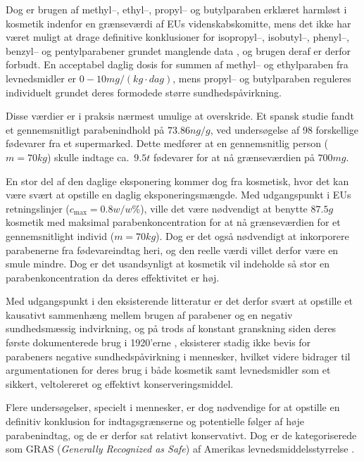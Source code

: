     Dog er brugen af methyl--, ethyl--, propyl-- og butylparaben erklæret harmløst i kosmetik indenfor en grænseværdi af EUs videnskabskomitte, mens det ikke har været muligt at drage definitive konklusioner for isopropyl--, isobutyl--, phenyl--, benzyl-- og pentylparabener grundet manglende data \parencite{Henr2013}, og brugen deraf er derfor forbudt. En acceptabel daglig dosis for summen af methyl-- og ethylparaben fra levnedsmidler er $0-10\si{mg\per (kg\cdot dag)}$,  mens propyl-- og butylparaben reguleres individuelt grundet deres formodede større sundhedspåvirkning.

    Disse værdier er i praksis nærmest umulige at overskride. Et spansk studie \parencite{Yola2020} fandt et gennemsnitligt parabenindhold på $73.86\si{ng\per g}$, ved undersøgelse af 98 forskellige fødevarer fra et supermarked. Dette medfører at en gennemsnitlig person ($m=70\si{kg}$) skulle indtage ca.\ $9.5\si{t}$ fødevarer for at nå grænseværdien på $700\si{mg}$.

    En stor del af den daglige eksponering kommer dog fra kosmetisk, hvor det kan være svært at opstille en daglig eksponeringsmængde. Med udgangspunkt i EUs retningslinjer ($c_{\text{max}}=0.8 \si{w\per w\%}$), ville det være nødvendigt at benytte $87.5\si{g}$ kosmetik med maksimal parabenkoncentration for at nå grænseværdien for et gennemsnitlight individ ($m=70\si{kg}$). Dog er det også nødvendigt at inkorporere parabenerne fra fødevareindtag heri, og den reelle værdi villet derfor være en smule mindre. Dog er det usandsynligt at kosmetik vil indeholde så stor en parabenkoncentration da deres effektivitet er høj.
    
    Med udgangspunkt i den eksisterende litteratur er det derfor svært at opstille et kausativt sammenhæng mellem brugen af parabener og en negativ sundhedsmæssig indvirkning, og på trods af konstant granskning siden deres første dokumenterede brug i 1920'erne \parencite{Mary1984}, eksisterer stadig ikke bevis for parabeners negative sundhedspåvirkning i mennesker, hvilket videre bidrager til argumentationen for deres brug i både kosmetik samt levnedsmidler som et sikkert, veltolereret og effektivt konserveringsmiddel.

    Flere undersøgelser, specielt i mennesker, er dog nødvendige for at opstille en definitiv konklusion for indtagsgrænserne og potentielle følger af høje parabenindtag, og de er derfor sat relativt konservativt. Dog er de kategoriserede som GRAS (\textit{Generally Recognized as Safe}) af Amerikas levnedsmiddelsstyrrelse \parencite{FDA2022}.

